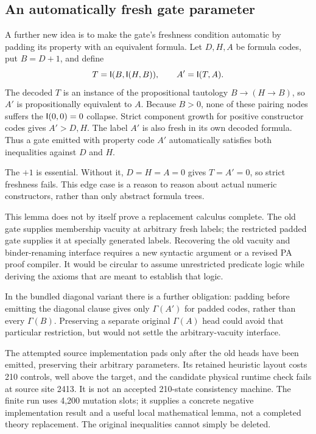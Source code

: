 \subsection{An automatically fresh gate parameter}

A further new idea is to make the gate's freshness condition automatic
by padding its property with an equivalent formula. Let $D,H,A$ be
formula codes, put $B=D+1$, and define
\[
 T=\mathsf I(B,\mathsf I(H,B)),\qquad A'=\mathsf I(T,A).
\]
The decoded $T$ is an instance of the propositional tautology
$B\to(H\to B)$, so $A'$ is propositionally equivalent to $A$.
Because $B>0$, none of these pairing nodes suffers the $\mathsf I(0,0)=0$
collapse. Strict component growth for positive constructor codes gives
$A'>D,H$. The label $A'$ is also fresh in its own decoded formula.
Thus a gate emitted with property code $A'$ automatically satisfies
both inequalities against $D$ and $H$.

The $+1$ is essential. Without it, $D=H=A=0$ gives $T=A'=0$,
so strict freshness fails. This edge case is a reason to reason about
actual numeric constructors, rather than only abstract formula trees.

This lemma does not by itself prove a replacement calculus complete.
The old gate supplies membership vacuity at arbitrary fresh labels;
the restricted padded gate supplies it at specially generated labels.
Recovering the old vacuity and binder-renaming interface requires a new
syntactic argument or a revised PA proof compiler. It would be circular
to assume unrestricted predicate logic while deriving the axioms that
are meant to establish that logic.

In the bundled diagonal variant there is a further obligation: padding
before emitting the diagonal clause gives only $\Gamma(A')$ for padded
codes, rather than every $\Gamma(B)$. Preserving a separate original
$\Gamma(A)$ head could avoid that particular restriction, but would
not settle the arbitrary-vacuity interface.

The attempted source implementation pads only after the old heads have
been emitted, preserving their arbitrary parameters. Its retained
heuristic layout costs 210 controls, well above the target, and the
candidate physical runtime check fails at source site 2413. It is not
an accepted 210-state consistency machine. The finite run uses 4,200
mutation slots; it supplies a concrete negative implementation result
and a useful local mathematical lemma, not a completed theory
replacement. The original inequalities cannot simply be deleted.
